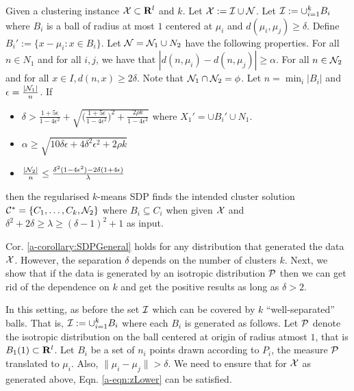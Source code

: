 \begin{corollary}
\label{a-corollary:SDPGeneral}
Given a clustering instance $\mathcal X \subset \mathbf R^l$ and $k$. Let $\mathcal X : = \mathcal I \cup \mathcal N$. Let $\mathcal I := \cup_{i=1}^k B_i$ where $B_i$ is a ball of radius at most $1$ centered at $\mu_i$ and $d(\mu_i, \mu_j) \ge \delta $. Define $B_i' := \{x - \mu_i : x \in B_i\}$. Let $\mathcal N = \mathcal N_1 \cup N_2$ have the following properties. For all $n \in N_1$ and for all $i, j$, we have that $| d(n, \mu_i) - d(n, \mu_j)| \ge \alpha$. For all $n \in \mathcal N_2$ and for all $x \in I, d(n, x) \ge 2\delta$. Note that $\mathcal N_1 \cap \mathcal N_2 = \phi$. Let $n = \min_i |B_i|$ and $\epsilon = \frac{|\mathcal N_1|}{n}$. If  

\begin{itemize}
  \item $\delta > \frac{1+5\epsilon}{1-4\epsilon^2} + \sqrt{ \Big(\frac{1+5\epsilon}{1-4\epsilon^2}\Big)^2 + \frac{2\rho k}{1-4\epsilon^2}}$  where $ X_1' = \cup B_i' \cup N_1$. 
  \item $\alpha \ge \sqrt{10\delta \epsilon + 4\delta^2 \epsilon^2+ 2\rho k}$ 
  \item $\frac{|\mathcal N_2|}{n} \le \frac{\delta^2(1-4\epsilon^2)-2\delta(1+4\epsilon)}{\lambda}$
\end{itemize}
then the regularised $k$-means SDP finds the intended cluster solution  $\mathcal C^* = \{C_1, \ldots, C_k, \mathcal N_2\}$ where $B_i \subseteq C_i$ when given $\mathcal X$ and $\delta^2+2\delta \ge \lambda \ge (\delta-1)^2 + 1$ as input.
\end{corollary}

\noindent Cor. \ref{a-corollary:SDPGeneral} holds for any distribution that generated the data $\mathcal X$. However, the separation $\delta$ depends on the number of clusters $k$. Next, we show that if the data is generated by an isotropic distribution $\mathcal P$ then we can get rid of the dependence on $k$ and get the positive results as long as $\delta > 2$. 

In this setting, as before the set $\mathcal I$ which can be covered by $k$ ``well-separated'' balls. That is, $\mathcal I := \cup_{i=1}^k B_i$ where each $B_i$ is generated as follows. Let $\mathcal P$ denote the isotropic distribution on the ball centered at origin of radius atmost $1$, that is $B_1(1)\subset \mathbf R^l$. Let $B_i$ be a set of $n_i$ points drawn according to $P_i$, the measure $\mathcal P$ translated to $\mu_i$. Also, $\|\mu_i - \mu_j\| > \delta$. We need to ensure that for $\mathcal X$ as generated above, Eqn. \ref{a-eqn:zLower} can be satisfied. 

